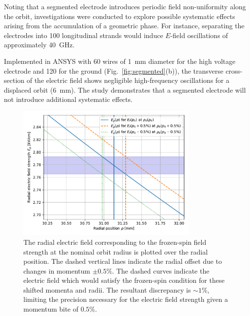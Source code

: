 \begin{refsection}
Noting that a segmented electrode introduces periodic field non-uniformity along the orbit, investigations were conducted to explore possible systematic effects arising from the accumulation of a geometric phase. For instance, separating the electrodes into 100 longitudinal strands would induce $E$-field oscillations of approximately \SI{40}{\giga\hertz}.

Implemented in ANSYS with 60 wires of \SI{1}{mm} diameter for the high voltage electrode and 120 for the ground (Fig.~\ref{fig:segmented}(b)), the transverse cross-section of the electric field shows negligible high-frequency oscillations for a displaced orbit (\SI{6}{mm}). The study demonstrates that a segmented electrode will not introduce additional systematic effects.
\begin{figure}
    \centering
    \includegraphics[width=0.8\textwidth]{Figures/muEDM/Electrode/ElectricField.pdf}
    \caption{The radial electric field corresponding to the frozen-spin field strength at the nominal orbit radius is plotted over the radial position. The dashed vertical lines indicate the radial offset due to changes in momentum $\pm0.5\%$. The dashed curves indicate the electric field which would satisfy the frozen-spin condition for these shifted momenta and radii. The resultant discrepancy is $\sim1\%$, limiting the precision necessary for the electric field strength given a momentum bite of $0.5\%$.}
    \label{fig:efieldprecision}
\end{figure}


\end{refsection}
